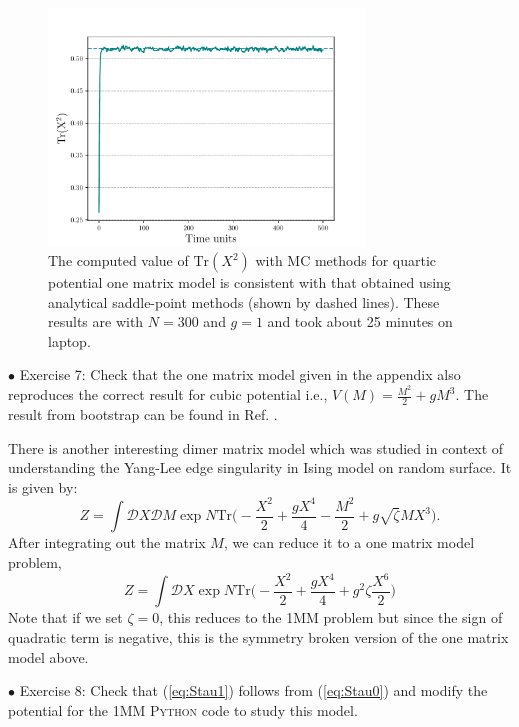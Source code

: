 \documentclass[11pt]{article}
\newcommand{\PY}{\textsc{Python }}
\begin{document}
\begin{figure}[htbp] 
	\centering 
	\includegraphics[width=0.75\textwidth]{figs/mm_plot.pdf}
	\caption{\label{fig:1MM_res}The computed value of $\mbox{Tr}(X^2)$ with MC methods for quartic potential
		one matrix model is consistent with that obtained using analytical saddle-point methods (shown by dashed lines). 
		These results are with $N = 300$ and $g = 1$ and took about 25 minutes on laptop.}
\end{figure}


\begin{mdframed}[backgroundcolor=blue!3] 
	\textsc{} 
	$\bullet$ Exercise 7:  Check that the one matrix model given in the appendix also reproduces the correct result for cubic potential 
	i.e., $V(M) = \frac{M^2}{2} + gM^3$. The result from bootstrap can be found in Ref. \cite{Kazakov:2021lel}. \\ 
	\label{ex:7} 
\end{mdframed} 

There is another interesting dimer matrix model which was 
studied in context of understanding the Yang-Lee edge singularity \cite{Staudacher:1989fy} in Ising model on random surface. It is given by: 
\begin{equation}
	\label{eq:Stau0}
	Z = \int \mathcal{D}X \mathcal{D}M \exp N \mbox{Tr}\Bigg(-\frac{X^2}{2} + \frac{gX^4}{4} - \frac{M^2}{2} + g \sqrt{\zeta} MX^3 \Bigg).
\end{equation}
After integrating out the matrix $M$, we can reduce it to a one matrix model problem, 
\begin{equation}
	\label{eq:Stau1} 
	Z = \int \mathcal{D}X \exp N \mbox{Tr}\Bigg(-\frac{X^2}{2} + \frac{gX^4}{4} + g^2 \zeta  \frac{X^6}{2}   \Bigg)
\end{equation}
Note that if we set $\zeta=0$, this reduces to the 1MM problem but since the sign of quadratic term is negative, this is the symmetry broken version of the one matrix model above. 
\begin{mdframed}[backgroundcolor=blue!3]  
	$\bullet$ Exercise 8: Check that (\ref{eq:Stau1}) follows from (\ref{eq:Stau0}) and modify the potential for the 1MM \PY code to study this model. 
\end{mdframed} 
\end{document}
